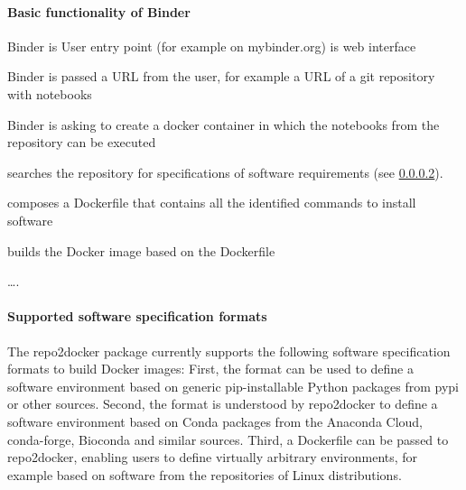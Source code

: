 \paragraph{Basic functionality of Binder}
\label{binder-how-does-it-work}

\begin{compactitem}
\item Binder is  User entry point (for example on mybinder.org) is web interface 
\item Binder is passed a URL from the user, for example a URL of a git repository with notebooks
\item Binder is asking \repotodocker{} to create a docker container in which the notebooks from the repository can be executed
\item \repotodocker{} searches the repository for specifications of software requirements (see \ref{repo2docker-supported-software-specifications}).
\item \repotodocker{} composes a Dockerfile that contains all the identified commands to install software
\item \repotodocker{} builds the Docker image based on the Dockerfile
\item \ldots {}.
\end{compactitem}


\paragraph{Supported software specification formats}
\label{repo2docker-supported-software-specifications}
The repo2docker package currently supports the following software specification
formats to build Docker images: First, the 
format can be used to define a software environment based on generic
pip-installable Python packages from pypi or other sources.  Second, the
 format is understood by repo2docker to define a
software environment based on Conda packages from the Anaconda Cloud,
conda-forge, Bioconda and similar sources.  Third, a Dockerfile can be passed to
repo2docker, enabling users to define virtually arbitrary environments,
for example based on software from the repositories of Linux distributions.
\TOWRITE{}{}


